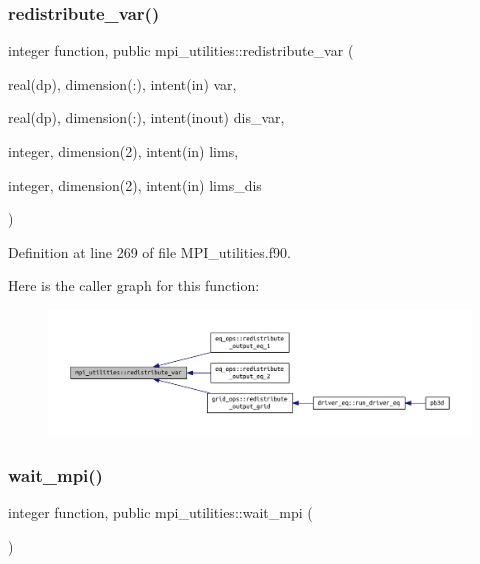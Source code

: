 \subsubsection{\texorpdfstring{redistribute\+\_\+var()}{redistribute\_var()}}
{\footnotesize\ttfamily integer function, public mpi\+\_\+utilities\+::redistribute\+\_\+var (\begin{DoxyParamCaption}\item[{real(dp), dimension(\+:), intent(in)}]{var,  }\item[{real(dp), dimension(\+:), intent(inout)}]{dis\+\_\+var,  }\item[{integer, dimension(2), intent(in)}]{lims,  }\item[{integer, dimension(2), intent(in)}]{lims\+\_\+dis }\end{DoxyParamCaption})}



Definition at line 269 of file M\+P\+I\+\_\+utilities.\+f90.

Here is the caller graph for this function\+:
\nopagebreak
\begin{figure}[H]
\begin{center}
\leavevmode
\includegraphics[width=350pt]{namespacempi__utilities_a128702990bd5fddc582e8fabcffc82b2_icgraph}
\end{center}
\end{figure}
\mbox{\label{namespacempi__utilities_a790ea24d32dd0e249541c1e57cd85536}} 
\subsubsection{\texorpdfstring{wait\+\_\+mpi()}{wait\_mpi()}}
{\footnotesize\ttfamily integer function, public mpi\+\_\+utilities\+::wait\+\_\+mpi (\begin{DoxyParamCaption}{ }\end{DoxyParamCaption})}



